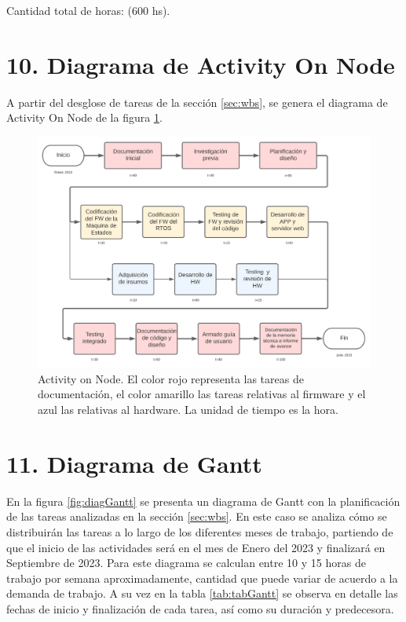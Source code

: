 \documentclass[
11pt, %
]{charter}
\begin{document}
Cantidad total de horas: (600 hs).

\section{10. Diagrama de Activity On Node}
\label{sec:AoN}

A partir del desglose de tareas de la sección \ref{sec:wbs}, se genera el diagrama de Activity On Node de la figura \ref{fig:AoN}.

\begin{figure}[htpb]
\centering 
\includegraphics[width=1\textwidth]{./Figuras/diagAoN.png}
\caption{Activity on Node. El color rojo representa las tareas de documentación, el color amarillo las tareas relativas al firmware y el azul las relativas al hardware. La unidad de tiempo es la hora.}
\label{fig:AoN}
\end{figure}

\section{11. Diagrama de Gantt}
\label{sec:gantt}

En la figura \ref{fig:diagGantt} se presenta un diagrama de Gantt con la planificación de las tareas analizadas en la sección \ref{sec:wbs}. En este caso se analiza cómo se distribuirán las tareas a lo largo de los diferentes meses de trabajo, partiendo de que el inicio de las actividades será en el mes de Enero del 2023 y finalizará en Septiembre de 2023. Para este diagrama se calculan entre 10 y 15 horas de trabajo por semana aproximadamente, cantidad que puede variar de acuerdo a la demanda de trabajo. A su vez en la tabla \ref{tab:tabGantt} se observa en detalle las fechas de inicio y finalización de cada tarea, así como su duración y predecesora.
\end{document}
